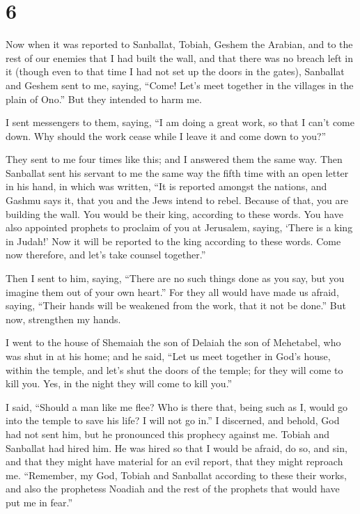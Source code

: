 \hypertarget{section-5}{%
\section{6}\label{section-5}}

 Now when it was reported to Sanballat, Tobiah, Geshem the
Arabian, and to the rest of our enemies that I had built the wall, and
that there was no breach left in it (though even to that time I had not
set up the doors in the gates),  Sanballat and Geshem sent
to me, saying, ``Come! Let's meet together in the villages in the plain
of Ono.'' But they intended to harm me.

 I sent messengers to them, saying, ``I am doing a great
work, so that I can't come down. Why should the work cease while I leave
it and come down to you?''

 They sent to me four times like this; and I answered them
the same way.  Then Sanballat sent his servant to me the
same way the fifth time with an open letter in his hand, 
in which was written, ``It is reported amongst the nations, and Gashmu
says it, that you and the Jews intend to rebel. Because of that, you are
building the wall. You would be their king, according to these words.
 You have also appointed prophets to proclaim of you at
Jerusalem, saying, `There is a king in Judah!' Now it will be reported
to the king according to these words. Come now therefore, and let's take
counsel together.''

 Then I sent to him, saying, ``There are no such things
done as you say, but you imagine them out of your own heart.''
 For they all would have made us afraid, saying, ``Their
hands will be weakened from the work, that it not be done.'' But now,
strengthen my hands.

 I went to the house of Shemaiah the son of Delaiah the
son of Mehetabel, who was shut in at his home; and he said, ``Let us
meet together in God's house, within the temple, and let's shut the
doors of the temple; for they will come to kill you. Yes, in the night
they will come to kill you.''

 I said, ``Should a man like me flee? Who is there that,
being such as I, would go into the temple to save his life? I will not
go in.''  I discerned, and behold, God had not sent him,
but he pronounced this prophecy against me. Tobiah and Sanballat had
hired him.  He was hired so that I would be afraid, do
so, and sin, and that they might have material for an evil report, that
they might reproach me.  ``Remember, my God, Tobiah and
Sanballat according to these their works, and also the prophetess
Noadiah and the rest of the prophets that would have put me in fear.''

